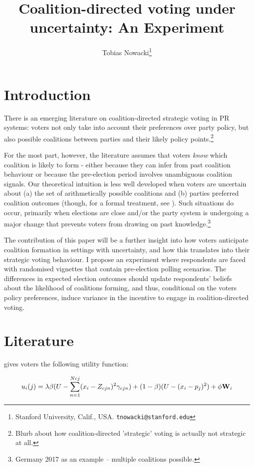 \documentclass[11pt]{article}
\title{Coalition-directed voting under uncertainty: An Experiment}
\author{Tobias Nowacki\thanks{Stanford University, Calif., USA. \texttt{tnowacki@stanford.edu}}}
\begin{document}
\maketitle

\onehalfspacing

\section{Introduction}

There is an emerging literature on coalition-directed strategic voting in PR systems: voters not only take into account their preferences over party policy, but also possible coalitions between parties and their likely policy points.\footnote{Blurb about how coalition-directed 'strategic' voting is actually not strategic at all.}

For the most part, however, the literature assumes that voters \textit{know} which coalition is likely to form - either because they can infer from past coalition behaviour \parencite{Armstrong2010} or because the pre-election period involves unambiguous coalition signals. Our theoretical intuition is less well developed when voters are uncertain about (a) the set of arithmetically possible coalitions and (b) parties preferred coalition outcomes (though, for a formal treatment, see \cite{Herrmann2014}). Such situations do occur, primarily when elections are close and/or the party system is undergoing a major change that prevents voters from drawing on past knowledge.\footnote{Germany 2017 as an example -- multiple coalitions possible.}

The contribution of this paper will be a further insight into how voters anticipate coalition formation in settings with uncertainty, and how this translates into their strategic voting behaviour. I propose an experiment where respondents are faced with randomised vignettes that contain pre-election polling scenarios. The differences in expected election outcomes should update respondents' beliefs about the likelihood of coalitions forming, and thus, conditional on the voters policy preferences, induce variance in the incentive to engage in coalition-directed voting.

\section{Literature}

\textcite{Duch2010} gives voters the following utility function:

\begin{equation}
    u_i(j) = \lambda {\beta (U - \sum_{n = 1}^{Ncj}(x_i - Z_{cjn})^{2} \gamma_{cjn}) + (1 - \beta) (U - (x_i - p_j)^2)} + \phi {\bf W}_i 
\end{equation}
\end{document}
